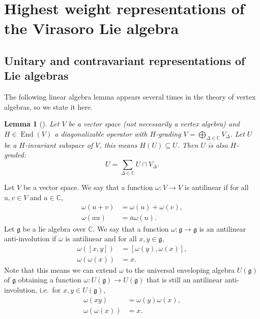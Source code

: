 \documentclass[a4paper, 12pt, reqno]{amsart}
\newtheorem{lemma}[theorem]{Lemma}
\theoremstyle{remark}
\numberwithin{equation}{subsection}
\DeclareMathOperator{\End}{End}
\begin{document}
\section{Highest weight representations of the Virasoro Lie algebra}
\label{sec:high-weight-repr}

\subsection{Unitary and contravariant representations of Lie algebras}
\label{sec:unit-contr-repr}

The following linear algebra lemma appears several times in the theory of vertex algebras, so we state it here.

\begin{lemma}[{\cite[Corollary 1.1]{kac_bombay_2013}}]
  \label{lmm:6}
  Let $V$ be a vector space (not necessarily a vertex algebra) and $H \in \End(V)$ a diagonalizable operator with $H$-grading $V = \bigoplus_{\Delta \in \mathbb{C}}V_{\Delta}$.
  Let $U$ be a $H$-invariant subspace of $V$, this means $H(U) \subseteq U$.
  Then $U$ is also $H$-graded:
  \begin{equation*}
    U = \sum_{\Delta \in \mathbb{C}}U \cap V_{\Delta}.
  \end{equation*}
\end{lemma}

Let $V$ be a  vector space.
We say that a function $\omega: V \to V$ is antilinear if for all $u, v \in V$ and $a \in \mathbb{C}$,
\begin{align*}
  \omega(u + v) &= \omega(u) + \omega(v), \\
  \omega(au) &= \overline{a}\omega(u).
\end{align*}
Let $\mathfrak{g}$ be a lie algebra over $\mathbb{C}$.
We say that a function $\omega: \mathfrak{g} \to \mathfrak{g}$ is an antilinear anti-involution if $\omega$ is antilinear and for all $x, y \in \mathfrak{g}$,
\begin{align*}
  \omega([x, y]) &= [\omega(y), \omega(x)], \\
  \omega(\omega(x)) &= x.
\end{align*}
Note that this means we can extend $\omega$ to the universal enveloping algebra $U(\mathfrak{g})$ of $\mathfrak{g}$ obtaining a function $\omega: U(\mathfrak{g}) \to U(\mathfrak{g})$ that is still an antilinear anti-involution, i.e.\ for $x, y \in U(\mathfrak{g})$,
\begin{align*}
  \omega(xy) &= \omega(y)\omega(x), \\
  \omega(\omega(x)) &= x.
\end{align*}
\end{document}
